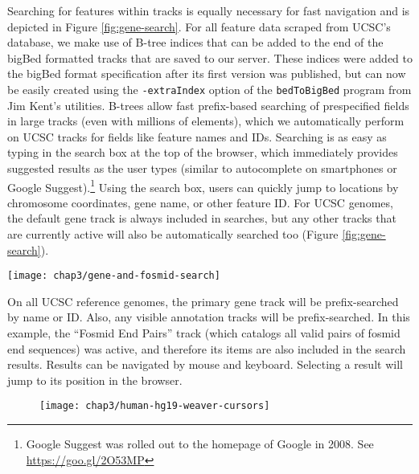 Searching for features within tracks is equally necessary for fast navigation and is depicted in Figure \ref{fig:gene-search}. For all feature data scraped from UCSC's database, we make use of B-tree indices that can be added to the end of the bigBed formatted tracks that are saved to our server. These indices were added to the bigBed format specification after its first version was published,\autocite{Kent2010} but can now be easily created using the \texttt{-extraIndex} option of the \texttt{bedToBigBed} program from Jim Kent's utilities. B-trees allow fast prefix-based searching of prespecified fields in large tracks (even with millions of elements), which we automatically perform on UCSC tracks for fields like feature names and IDs. Searching is as easy as typing in the search box at the top of the browser, which immediately provides suggested results as the user types (similar to autocomplete on smartphones or Google Suggest).\footnote{Google Suggest was rolled out to the homepage of Google in 2008. See \url{https://goo.gl/2O53MP}} Using the search box, users can quickly jump to locations by chromosome coordinates, gene name, or other feature ID. For UCSC genomes, the default gene track is always included in searches, but any other tracks that are currently active will also be automatically searched too (Figure \ref{fig:gene-search}).

\begin{marginfigure}
  \texttt{[image: chap3/gene-and-fosmid-search]}               
  \caption[Searching for features by name]{On all UCSC reference genomes, the primary gene track will be prefix-searched by name or ID. Also, any visible annotation tracks will be prefix-searched. In this example, the ``Fosmid End Pairs'' track (which catalogs all valid pairs of fosmid end sequences) was active, and therefore its items are also included in the search results. Results can be navigated by mouse and keyboard. Selecting a result will jump to its position in the browser.}
  \label{fig:gene-search}
\end{marginfigure}

\begin{figure*}[tbp]
  \texttt{[image: chap3/human-hg19-weaver-cursors]}       
\end{figure*}

